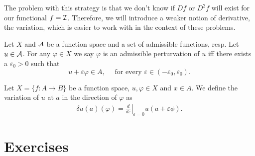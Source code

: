 The problem with this strategy is that we don't know if $Df$ or $D^2f$ will
exist for our functional $f = \mathcal{I}$. Therefore, we will introduce a weaker
notion of derivative, the variation, which is easier to work with in the
context of these problems.

\begin{dfn}

  Let $X$ and $\mathcal{A}$ be a function space and a set of admissible functions,
  resp. Let $u \in \mathcal{A}$. For any $\varphi \in X$ we say $\varphi$ is an
  admissible perturvation of $u$ iff there exists a $\varepsilon_0 > 0$ such
  that
  \[
    u + \varepsilon \varphi \in A,\quad \text{ for every } \varepsilon \in
    (-\varepsilon_0, \varepsilon_0).
  \]
\end{dfn}


\begin{dfn}
  [Variation]

  Let $X = \{ f : A \to B \}$ be a function space, $u, \varphi \in X$ and $x
  \in A$. We define the variation of $u$ at $a$ in the direction of $\varphi$
  as
  \begin{align}
    \label{eq:variation}
    \delta u(a)(\varphi) = \left. \frac{d}{d\varepsilon}\right|_{\varepsilon =
    0} u(a + \varepsilon \phi).
  \end{align}
\end{dfn}


\section{Exercises}

